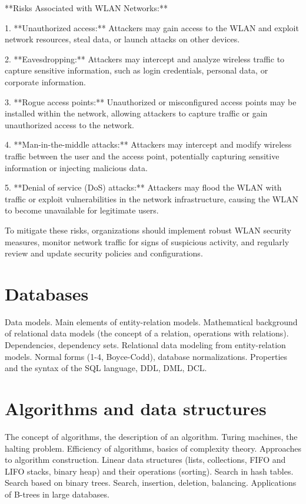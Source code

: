 \documentclass{article}
\begin{document}
**Risks Associated with WLAN Networks:**

1. **Unauthorized access:** Attackers may gain access to the WLAN and exploit network resources, steal data, or launch attacks on other devices.

2. **Eavesdropping:** Attackers may intercept and analyze wireless traffic to capture sensitive information, such as login credentials, personal data, or corporate information.

3. **Rogue access points:** Unauthorized or misconfigured access points may be installed within the network, allowing attackers to capture traffic or gain unauthorized access to the network.

4. **Man-in-the-middle attacks:** Attackers may intercept and modify wireless traffic between the user and the access point, potentially capturing sensitive information or injecting malicious data.

5. **Denial of service (DoS) attacks:** Attackers may flood the WLAN with traffic or exploit vulnerabilities in the network infrastructure, causing the WLAN to become unavailable for legitimate users.

To mitigate these risks, organizations should implement robust WLAN security measures, monitor network traffic for signs of suspicious activity, and regularly review and update security policies and configurations.


\section{Databases}

Data models. Main elements of entity-relation models. Mathematical background of relational data models (the concept of a relation, operations with relations). Dependencies, dependency sets. Relational data modeling from entity-relation models. Normal forms (1-4, Boyce-Codd), database normalizations. Properties and the syntax of the SQL language, DDL, DML, DCL.


\section{Algorithms and data structures}

The concept of algorithms, the description of an algorithm. Turing machines, the halting problem. Efficiency of algorithms, basics of complexity theory. Approaches to algorithm construction. Linear data structures (lists, collections, FIFO and LIFO stacks, binary heap) and their operations (sorting). Search in hash tables. Search based on binary trees. Search, insertion, deletion, balancing. Applications of B-trees in large databases.
\end{document}
